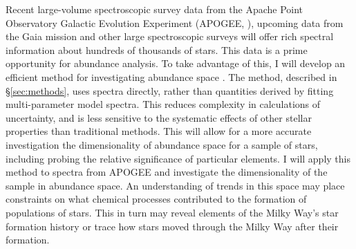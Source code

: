 \documentclass[preprint]{aastex}
\begin{document}
Recent large-volume spectroscopic survey data from the Apache Point Observatory Galactic Evolution Experiment (APOGEE, \citealt{APOGEE}), upcoming data from the Gaia mission \citep{GAIA} and other large spectroscopic surveys will offer rich spectral information about hundreds of thousands of stars. This data is a prime opportunity for abundance analysis. To take advantage of this, I will develop an efficient method for investigating abundance space \citep{openclusters}. The method, described in \S\ref{sec:methods}, uses spectra directly, rather than quantities derived by fitting multi-parameter model spectra. This reduces complexity in calculations of uncertainty, and is less sensitive to the systematic effects of other stellar properties than traditional methods. This will allow for a more accurate investigation the dimensionality of abundance space for a sample of stars, including probing the relative significance of particular elements. I will apply this method to spectra from APOGEE and investigate the dimensionality of the sample in abundance space. An understanding of trends in this space may place constraints on what chemical processes contributed to the formation of populations of stars. This in turn may reveal elements of the Milky Way's star formation history or trace how stars moved through the Milky Way after their formation.

 



\end{document}

